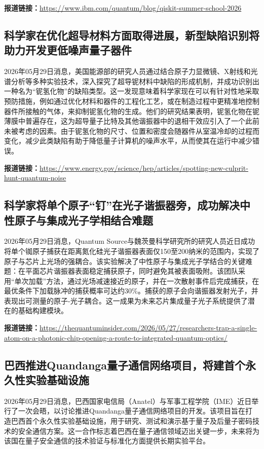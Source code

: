 \documentclass[12pt,a4paper]{ctexart}
\begin{document}
\noindent\textbf{报道链接：}\url{https://www.ibm.com/quantum/blog/qiskit-summer-school-2026}

\subsection{ 科学家在优化超导材料方面取得进展，新型缺陷识别将助力开发更低噪声量子器件 }

2026年05月29日消息，美国能源部的研究人员通过结合原子力显微镜、X射线和光谱分析等多种实验技术，深入探究了超导铌材料中缺陷的形成机制，并成功识别出一种名为“铌氢化物”的缺陷类型。这一发现意味着科学家现在可以有针对性地采取预防措施，例如通过优化材料和器件的工程化工艺，或在制造过程中更精准地控制器件所接触的气体，来抑制铌氢化物的生成。他们的研究结果表明，铌氢化物在铌薄膜中普遍存在，这为超导量子比特及其他谐振器中的退相干效应引入了一个此前未被考虑的因素。由于铌氢化物的尺寸、位置和密度会随器件从室温冷却的过程而变化，减少此类缺陷有助于降低量子计算机的噪声水平，从而使其在运行中减少错误。

\noindent\textbf{报道链接：}\url{https://www.energy.gov/science/hep/articles/spotting-new-culprit-hunt-quantum-noise}

\subsection{ 科学家将单个原子“钉”在光子谐振器旁，成功解决中性原子与集成光子学相结合难题 }

2026年05月29日消息，Quantum Source与魏茨曼科学研究所的研究人员近日成功将单个铷原子捕获在距离氮化硅光子谐振器表面仅150至200纳米的范围内，实现了原子与芯片上光场的强耦合。该实验解决了中性原子与集成光子学结合的关键难题：在平面芯片谐振器表面稳定捕获原子，同时避免其被表面吸附。该团队采用“单次加载”方法，通过光场减速接近的原子，并在一次散射事件后完成捕获，在最优条件下加载脉冲的捕获概率可达约30\%。捕获的原子会向谐振器发射光子，并表现出可测量的原子-光子耦合。这一成果为未来芯片集成量子光子系统提供了潜在的基础构建模块。

\noindent\textbf{报道链接：}\url{https://thequantuminsider.com/2026/05/27/researchers-trap-a-single-atom-on-a-photonic-chip-opening-a-route-to-integrated-quantum-optics/}

\subsection{ 巴西推进Quandanga量子通信网络项目，将建首个永久性实验基础设施 }

2026年05月29日消息，巴西国家电信局（Anatel）与军事工程学院（IME）近日举行了一次会晤，以讨论推进Quandanga量子通信网络项目的开发。该项目旨在打造巴西首个永久性实验基础设施，用于研究、测试和演示基于量子及后量子密码技术的安全通信方案。这一合作标志着巴西在量子通信领域迈出关键一步，未来将为该国在量子安全通信的技术验证与标准化方面提供长期实验平台。
\end{document}
